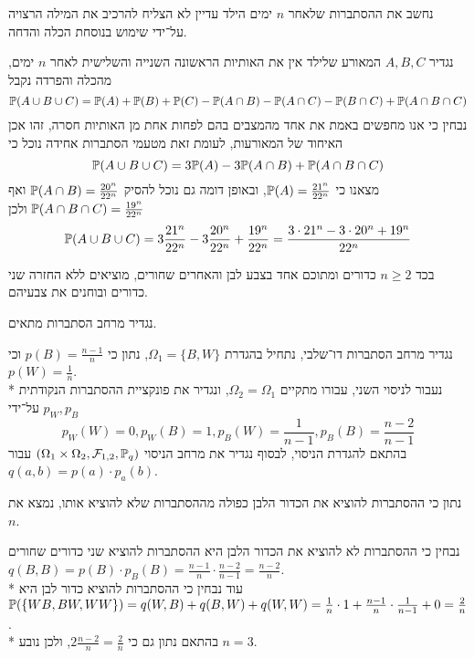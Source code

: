 \Subquestion{}
נחשב את ההסתברות שלאחר $n$ ימים הילד עדיין לא הצליח להרכיב את המילה הרצויה על־ידי שימוש בנוסחת הכלה והדחה.
\begin{solution}
	נגדיר $A, B, C$ המאורע שלילד אין את האותיות הראשונה השנייה והשלישית לאחר $n$ ימים, מהכלה והפרדה נקבל
	\[
		\mathbb{P}(A \cup B \cup C) = \mathbb{P}(A) + \mathbb{P}(B) + \mathbb{P}(C) - \mathbb{P}(A \cap B) - \mathbb{P}(A \cap C) - \mathbb{P}(B \cap C) + \mathbb{P}(A \cap B \cap C)
	\]
	נבחין כי אנו מחפשים באמת את אחד מהמצבים בהם לפחות אחת מן האותיות חסרה, זהו אכן האיחוד של המאורעות, לעומת זאת מטעמי הסתברות אחידה נוכל כי
	\[
		\mathbb{P}(A \cup B \cup C) = 3\mathbb{P}(A) - 3\mathbb{P}(A \cap B) + \mathbb{P}(A \cap B \cap C)
	\]
	מצאנו כי $\mathbb{P}(A) = \frac{21^n}{22^n}$, ובאופן דומה גם נוכל להסיק $\mathbb{P}(A \cap B) = \frac{20^n}{22^n}$ ואף $\mathbb{P}(A \cap B \cap C) = \frac{19^n}{22^n}$ ולכן
	\[
		\mathbb{P}(A \cup B \cup C)
		= 3 \frac{21^n}{22^n} - 3 \frac{20^n}{22^n} + \frac{19^n}{22^n}
		= \frac{3 \cdot 21^n - 3 \cdot 20^n + 19^n}{22^n}
	\]
\end{solution}

\Question{}
בכד $n \ge 2$ כדורים ומתוכם אחד בצבע לבן והאחרים שחורים, מוציאים ללא החזרה שני כדורים ובוחנים את צבעיהם.

\Subquestion{}
נגדיר מרחב הסתברות מתאים.
\begin{solution}
	נגדיר מרחב הסתברות דו־שלבי, נתחיל בהגדרת $\Omega_1 = \{ B, W \}$, נתון כי $p(B) = \frac{n - 1}{n}$ וכי $p(W) = \frac{1}{n}$. \\*
	נעבור לניסוי השני, עבורו מתקיים $\Omega_2 = \Omega_1$, ונגדיר את פונקציית ההסתברות הנקודתית $p_W, p_B$ על־ידי
	\[
		p_W(W) = 0, p_W(B) = 1,
		p_B(W) = \frac{1}{n - 1}, p_B(B) = \frac{n - 2}{n - 1}
	\]
	בהתאם להגדרת הניסוי, לבסוף נגדיר את מרחב הניסוי $(\Omega_1 \times \Omega_2, \mathcal{F}_{1, 2}, \mathbb{P}_q)$ עבור $q(a, b) = p(a) \cdot p_a(b)$.
\end{solution}

\Subquestion{}
נתון כי ההסתברות להוציא את הכדור הלבן כפולה מההסתברות שלא להוציא אותו, נמצא את $n$.
\begin{solution}
	נבחין כי ההסתברות לא להוציא את הכדור הלבן היא ההסתברות להוציא שני כדורים שחורים $q(B, B) = p(B) \cdot p_B(B) = \frac{n - 1}{n} \cdot \frac{n - 2}{n - 1} = \frac{n - 2}{n}$. \\*
	עוד נבחין כי ההסתברות להוציא כדור לבן היא $\mathbb{P}(\{ WB, BW, WW \}) = q(W, B) + q(B, W) + q(W, W) = \frac{1}{n} \cdot 1 + \frac{n - 1}{n} \cdot \frac{1}{n - 1} + 0 = \frac{2}{n}$. \\*
	בהתאם נתון גם כי $2 \frac{n - 2}{n} = \frac{2}{n}$, ולכן נובע $n = 3$.
\end{solution}

